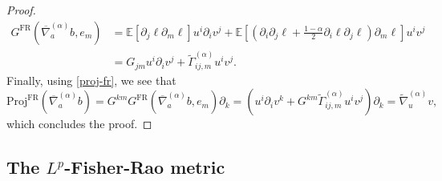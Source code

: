 \documentclass[11pt]{amsart}
\theoremstyle{definition}
\newcommand{\E}{\mathbb E}
\newcommand{\GFR}{G^{\mathrm{FR}}}
\newcommand{\nablabar}{\overline{\nabla}}
\newcommand{\nablatilde}{\tilde{\nabla}}
\begin{document}
\begin{proof}
\begin{align*}
\GFR(\nablabar^{(\alpha)}_ab,e_m)&=\E[\partial_j\ell\partial_m\ell]u^i\partial_iv^j + \E\left[(\partial_i\partial_j\ell + \frac{1-\alpha}{2}\partial_i\ell\partial_j\ell)\partial_m\ell\right]u^iv^j\\
&=G_{jm} u^i\partial_iv^j+ \tilde\Gamma^{(\alpha)}_{ij,m}u^iv^j.
\end{align*}
Finally, using \eqref{proj-fr}, we see that 
$$\mathrm{Proj}^{\mathrm{FR}}(\nablabar^{(\alpha)}_ab) = G^{km}\GFR(\nablabar^{(\alpha)}_ab,e_m)\partial_k= \left(u^i\partial_iv^k+ G^{km}\tilde\Gamma^{(\alpha)}_{ij,m}u^iv^j\right)\partial_k=\nablatilde^{(\alpha)}_{u}v,$$%
which concludes the proof.
\end{proof}

\subsection{The $L^p$-Fisher-Rao metric}
\end{document}
